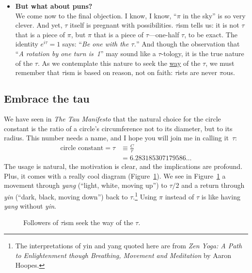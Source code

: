 \begin{itemize}
  \item \textbf{But what about puns?} \\ We come now to the final objection. I know, I know, ``$\pi$ in the sky'' is so very clever. And yet, $\tau$ itself is pregnant with possibilities. $\tau$ism tells us: it is not $\tau$ that is a piece of $\pi$, but $\pi$ that is a piece of $\tau$---one-half $\tau$, to be exact. The identity $e^{i\tau} = 1$ says: ``\emph{Be one with the $\tau$.}'' And though the observation that ``\emph{A rotation by one turn is~1}'' may sound like a $\tau$-tology, it is the true nature of the $\tau$. As we contemplate this nature to seek the \href{https://en.wikipedia.org/wiki/Tao}{way} of the $\tau$, we must remember that $\tau$ism is based on reason, not on faith: $\tau$ists are never $\pi$ous.

\end{itemize}


  \subsection{Embrace the tau} %
  \label{sec:embrace_the_tau}

We have seen in \emph{The Tau Manifesto} that the natural choice for the circle constant is the ratio of a circle's circumference not to its diameter, but to its radius. This number needs a name, and I hope you will join me in calling it~$\tau$:
\[
\begin{split}
\mbox{circle constant} = \tau & \equiv \frac{C}{r} \\
                              & = 6.283185307179586\ldots
\end{split}
\]
The usage is natural, the motivation is clear, and the implications are profound. Plus, it comes with a really cool diagram (Figure~\ref{fig:tauism}). We see in Figure~\ref{fig:tauism} a movement through \emph{yang} (``light, white, moving up'') to $\tau/2$ and a return through \emph{yin} (``dark, black, moving down'') back to $\tau$.\footnote{The interpretations of yin and yang quoted here are from \emph{Zen Yoga: A Path to Enlightenment though Breathing, Movement and Meditation} by Aaron Hoopes.} Using $\pi$ instead of $\tau$ is like having \emph{yang} without \emph{yin}.

\begin{figure}
\begin{center}
\end{center}
\caption{Followers of $\tau$ism seek the way of the $\tau$.\label{fig:tauism}}
\end{figure}

